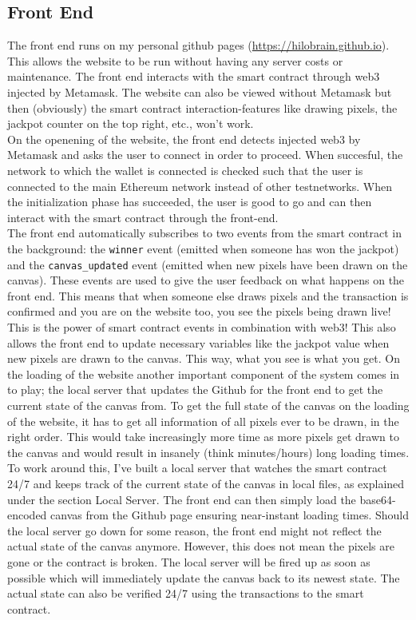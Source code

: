 \documentclass[a4paper]{article}
\begin{document}
\subsection{Front End}
The front end runs on my personal github pages (\url{https://hilobrain.github.io}). This allows the website to be run without having any server costs or maintenance. The front end interacts with the smart contract through web3 injected by Metamask. The website can also be viewed without Metamask but then (obviously) the smart contract interaction-features like drawing pixels, the jackpot counter on the top right, etc., won't work. \\
On the openening of the website, the front end detects injected web3 by Metamask and asks the user to connect in order to proceed. When succesful, the network to which the wallet is connected is checked such that the user is connected to the main Ethereum network instead of other testnetworks. When the initialization phase has succeeded, the user is good to go and can then interact with the smart contract through the front-end. \\
The front end automatically subscribes to two events from the smart contract in the background: the \lstinline{winner} event (emitted when someone has won the jackpot) and the \lstinline{canvas_updated} event (emitted when new pixels have been drawn on the canvas). These events are used to give the user feedback on what happens on the front end. This means that when someone else draws pixels and the transaction is confirmed and you are on the website too, you see the pixels being drawn live! This is the power of smart contract events in combination with web3! This also allows the front end to update necessary variables like the jackpot value when new pixels are drawn to the canvas. This way, what you see is what you get.
On the loading of the website another important component of the system comes in to play; the local server that updates the Github for the front end to get the current state of the canvas from. To get the full state of the canvas on the loading of the website, it has to get all information of all pixels ever to be drawn, in the right order. This would take increasingly more time as more pixels get drawn to the canvas and would result in insanely (think minutes/hours) long loading times. To work around this, I've built a local server that watches the smart contract 24/7 and keeps track of the current state of the canvas in local files, as explained under the section Local Server. The front end can then simply load the base64-encoded canvas from the Github page ensuring near-instant loading times. Should the local server go down for some reason, the front end might not reflect the actual state of the canvas anymore. However, this does not mean the pixels are gone or the contract is broken. The local server will be fired up as soon as possible which will immediately update the canvas back to its newest state. The actual state can also be verified 24/7 using the transactions to the smart contract. \\
\end{document}
